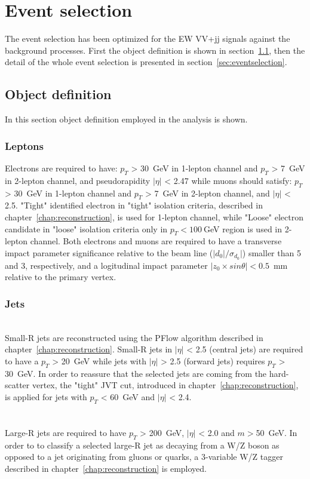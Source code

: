 \chapter{Event selection}
\label{chap:eventselection}
The event selection has been optimized for the EW VV+jj signals against the background processes.
First the object definition is shown in section~\ref{sec:object}, then the detail of the whole event selection is presented in section~\ref{sec:eventselection}.
\section{Object definition}
\label{sec:object}
In this section object definition employed in the analysis is shown.
\subsection{Leptons}
Electrons are required to have: $p_T$ > 30~GeV in 1-lepton channel and $p_T$ > 7~GeV in 2-lepton channel, and pseudorapidity $|\eta|$ < 2.47 while muons should satisfy: $p_T$ > 30~GeV in 1-lepton channel and $p_T$ > 7~GeV in 2-lepton channel, and $|\eta|$ < 2.5. 
"Tight" identified electron in "tight" isolation criteria, described in chapter~\ref{chap:reconstruction}, is used for 1-lepton channel, while "Loose" electron candidate in "loose" isolation criteria only in $p_T < 100~$GeV region is used in 2-lepton channel. 
Both electrons and muons are required to have a transverse impact parameter significance relative to the beam line ($|d_0|/\sigma_{d_0}|$) smaller than 5 and 3, respectively, and a logitudinal impact parameter $|z_0 \times sin \theta | < 0.5$~mm relative to the primary vertex.

\subsection{Jets}
\noindent\textbf{} \\ 
Small-R jets are reconstructed using the PFlow algorithm described in chapter~\ref{chap:reconstruction}.
Small-R jets in $|\eta|$ < 2.5 (central jets) are required to have a $p_T$ > 20~GeV while jets with $|\eta|$ > 2.5 (forward jets) requires $p_T$ > 30~GeV. 
In order to reassure that the selected jets are coming from the hard-scatter vertex, the "tight" JVT cut, introduced in chapter~\ref{chap:reconstruction}, is applied for jets with $p_T$ < 60~GeV and $|\eta|$ < 2.4. \\ 
\\
\noindent\textbf{} \\ 
Large-R jets are required to have $p_T$ > 200~GeV, $|\eta|$ < 2.0 and $m > $50~GeV. 
In order to to classify a selected large-R jet as decaying from a W/Z boson as opposed to a jet originating from gluons or quarks, a 3-variable W/Z tagger described in chapter~\ref{chap:reconstruction} is employed. 

